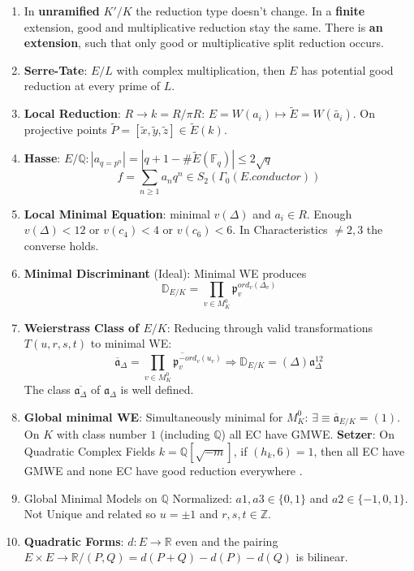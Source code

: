 \documentclass{article}
\newcommand{\Q}{\mathbb{Q}}
\newcommand{\R}{\mathbb{R}}
\newcommand{\Z}{\mathbb{Z}}
\newcommand{\F}{\mathbb{F}}
\newcommand{\D}{\mathbb{D}}
\newcommand{\af}{\mathfrak{a}}
\newcommand{\pp}{\mathfrak{p}}
\newcommand{\ra}{\rightarrow}
\newcommand{\Ra}{\Rightarrow}
\begin{document}
\begin{multicols}{2}
\begin{enumerate}
\item In \textbf{unramified} $K'/K$ the reduction type doesn't change. In a \textbf{finite} extension, good and multiplicative reduction stay the same. There is \textbf{an extension}, such that only good or multiplicative split reduction occurs.

\item \textbf{Serre-Tate}: $E/L$ with complex multiplication, then $E$ has potential good reduction at every prime of $L$. 

\item \textbf{Local Reduction}: $R \ra k = R/\pi R$: $E=W(a_i) \mapsto \tilde{E}=W(\tilde{a_i})$. On projective points $\tilde{P} = [\tilde{x},\tilde{y}, \tilde{z}] \in \tilde{E}(k)$.

\item \textbf{Hasse}: $E/\Q: |a_{q = p^n}| = |q+1 - \# \tilde{E}(\F_q)| \leq 2 \sqrt{q}$ 
\[f = \sum_{n \geq 1} a_nq^n \in S_2(\Gamma_0(E.conductor))\] 

\item \textbf{Local Minimal Equation}: minimal $v(\Delta)$ and  $a_i \in R$. Enough $v(\Delta) < 12$ or  $v(c_4) < 4$ or $v(c_6) < 6$. In Characteristics $\neq 2,3$ the converse holds. \\

\item \textbf{Minimal Discriminant} (Ideal): Minimal WE produces 
\[\D_{E/K} = \prod_{v \in M_K^0}\pp_v^{ord_v(\Delta_v)}\] 

\item \textbf{Weierstrass Class of $E/K$}: Reducing through valid transformations $T(u,r,s,t)$ to minimal WE:
\[\overline{\af}_{\Delta} = \overline{\prod_{v \in M_K^0} \pp_v^{-ord_v(u_v)}} \Ra \D_{E/K} = (\Delta)\af_{\Delta}^{12}\]
The class $\overline{\af_\Delta}$ of $\af_{\Delta}$ is well defined.

\item \textbf{Global minimal WE}: Simultaneously minimal for $M_K^0$: $\exists \equiv \overline{\af}_{E/K} = (1)$. On $K$ with class number $1$ (including $\Q$) all EC have GMWE. \textbf{Setzer}: On Quadratic Complex Fields $k = \Q[\sqrt{-m}]$, if $(h_k,6) = 1$, then all EC have GMWE and none EC have good reduction everywhere . 

\item Global Minimal Models on $\Q$ Normalized: $a1,a3 \in \{0,1\}$ and $a2 \in \{-1,0,1\}$. Not Unique and related so $u = \pm 1$ and $r,s,t \in \Z$. 

\item \textbf{Quadratic Forms}: $d: E \ra \R$ even and the pairing $E \times E \ra \R/(P,Q) = d(P+Q) - d(P) - d(Q)$ is bilinear.


\end{enumerate}
\end{multicols}
\end{document}
